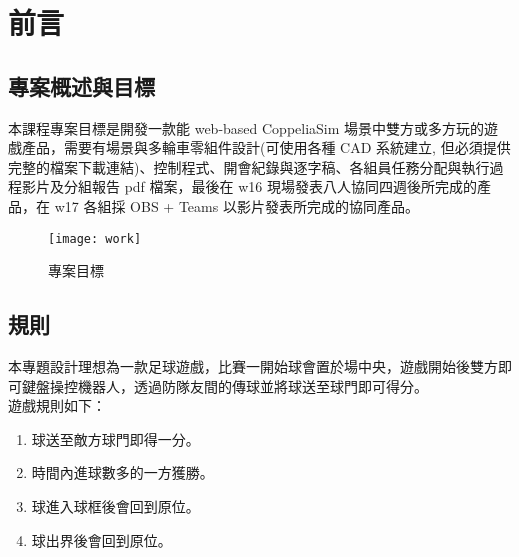 \chapter{前言}
\renewcommand{\baselinestretch}{10.0} %
\setcounter{page}{1}  %
\fontsize{14pt}{2.5pt}\sectionef
\section{專案概述與目標}
本課程專案目標是開發一款能 web-based CoppeliaSim 場景中雙方或多方玩的遊戲產品，需要有場景與多輪車零組件設計(可使用各種 CAD 系統建立, 但必須提供完整的檔案下載連結)、控制程式、開會紀錄與逐字稿、各組員任務分配與執行過程影片及分組報告 pdf 檔案，最後在 w16 現場發表八人協同四週後所完成的產品，在 w17 各組採 OBS + Teams 以影片發表所完成的協同產品。
\begin{figure}[hbt!]
\begin{center}
\texttt{[image: work]}
\caption{\Large 專案目標}\label{專案目標}
\end{center}
\end{figure} 
\section{規則}
本專題設計理想為一款足球遊戲，比賽一開始球會置於場中央，遊戲開始後雙方即
可鍵盤操控機器人，透過防隊友間的傳球並將球送至球門即可得分。\\
遊戲規則如下：\\
\begin{enumerate}
\item 球送至敵方球門即得一分。\\
\item 時間內進球數多的一方獲勝。\\
\item 球進入球框後會回到原位。\\
\item 球出界後會回到原位。\\
\end{enumerate}
\renewcommand{\baselinestretch}{0.5} %